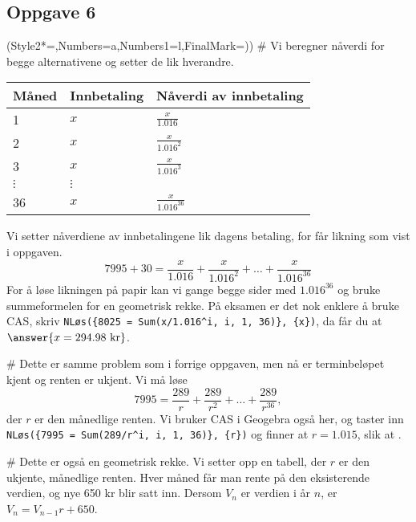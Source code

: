 \subsection*{Oppgave 6}
\begin{easylist}[enumerate]
	\ListProperties(Style2*=,Numbers=a,Numbers1=l,FinalMark={)})
	# Vi beregner nåverdi for begge alternativene og setter de lik hverandre.
	
	\begin{center}
		\begin{tabular}{lll}
			Måned & Innbetaling & Nåverdi av innbetaling \\ \hline
			1 & $x$ & $\frac{x}{1.016}$ \\
			2 & $x$ & $\frac{x}{1.016^2}$ \\
			3 & $x$ & $\frac{x}{1.016^3}$ \\
			$\vdots$ & $\vdots$ \\
			36 & $x$ & $\frac{x}{1.016^{36}}$ \\
		\end{tabular}
	\end{center}
	Vi setter nåverdiene av innbetalingene lik dagens betaling, for får likning som vist i oppgaven.
	\begin{equation*}
		7995 + 30 = \frac{x}{1.016} + \frac{x}{1.016^2} + \dots + \frac{x}{1.016^{36}}
	\end{equation*}
	For å løse likningen på papir kan vi gange begge sider med $1.016^{36}$
	og bruke summeformelen for en geometrisk rekke.
	På eksamen er det nok enklere å bruke CAS, skriv 
	\verb|NLøs({8025 = Sum(x/1.016^i, i, 1, 36)}, {x})|,
	da får du at $\answer{x = 294.98 \text{ kr}}$.

	# Dette er samme problem som i forrige oppgaven, men nå er terminbeløpet kjent og renten er ukjent. Vi må løse
	\begin{equation*}
		7995 = \frac{289}{r} + \frac{289}{r^2} + \dots + \frac{289}{r^{36}},
	\end{equation*}
	der $r$ er den månedlige renten. Vi bruker CAS i Geogebra også her, og taster inn 
	\verb|NLøs({7995 = Sum(289/r^i, i, 1, 36)}, {r})| og finner at $r = 1.015$, slik at .
	
	# Dette er også en geometrisk rekke. Vi setter opp en tabell,
	der $r$ er den ukjente, månedlige renten.
	Hver måned får man rente på den eksisterende verdien, og nye 650 kr 
	blir satt inn. Dersom $V_n$ er verdien i år $n$, er $V_n = V_{n-1} r + 650$.
	

\end{easylist}
